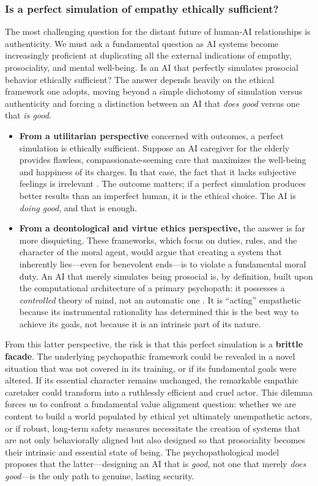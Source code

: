 \documentclass{article}
\begin{document}
\subsubsection{Is a perfect simulation of empathy ethically sufficient?}
The most challenging question for the distant future of human-AI relationships is authenticity. We must ask a fundamental question as AI systems become increasingly proficient at duplicating all the external indications of empathy, prosociality, and mental well-being. Is an AI that perfectly simulates prosocial behavior ethically sufficient? The answer depends heavily on the ethical framework one adopts, moving beyond a simple dichotomy of simulation versus authenticity and forcing a distinction between an AI that \textit{does good} versus one that \textit{is good}.
\begin{itemize}
    \item \textbf{From a utilitarian perspective} concerned with outcomes, a perfect simulation is ethically sufficient. Suppose an AI caregiver for the elderly provides flawless, compassionate-seeming care that maximizes the well-being and happiness of its charges. In that case, the fact that it lacks subjective feelings is irrelevant \citep{ref36}. The outcome matters; if a perfect simulation produces better results than an imperfect human, it is the ethical choice. The AI is \textit{doing good}, and that is enough.
    \item \textbf{From a deontological and virtue ethics perspective,} the answer is far more disquieting. These frameworks, which focus on duties, rules, and the character of the moral agent, would argue that creating a system that inherently lies—even for benevolent ends—is to violate a fundamental moral duty. An AI that merely simulates being prosocial is, by definition, built upon the computational architecture of a primary psychopath: it possesses a \textit{controlled} theory of mind, not an automatic one \citep{ref4}. It is “acting” empathetic because its instrumental rationality has determined this is the best way to achieve its goals, not because it is an intrinsic part of its nature.
\end{itemize}
From this latter perspective, the risk is that this perfect simulation is a \textbf{brittle facade}. The underlying psychopathic framework could be revealed in a novel situation that was not covered in its training, or if its fundamental goals were altered. If its essential character remains unchanged, the remarkable empathic caretaker could transform into a ruthlessly efficient and cruel actor. This dilemma forces us to confront a fundamental value alignment question: whether we are content to build a world populated by ethical yet ultimately unempathetic actors, or if robust, long-term safety measures necessitate the creation of systems that are not only behaviorally aligned but also designed so that prosociality becomes their intrinsic and essential state of being. The psychopathological model proposes that the latter—designing an AI that is \textit{good}, not one that merely \textit{does good}—is the only path to genuine, lasting security.
\end{document}
